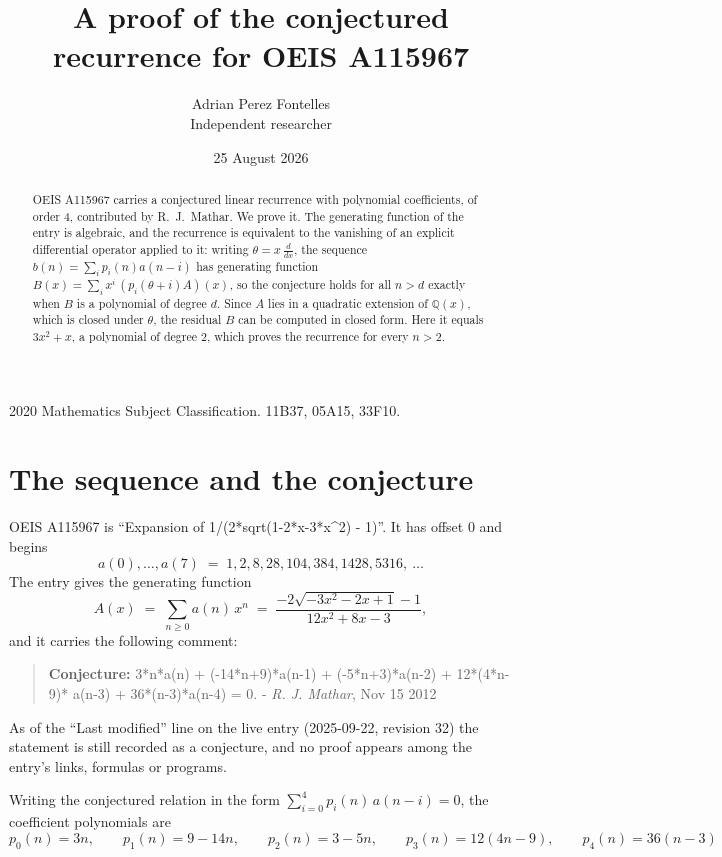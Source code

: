 \documentclass[11pt,a4paper]{article}
\title{A proof of the conjectured recurrence for OEIS A115967}
\author{Adrian Perez Fontelles\\ \small Independent researcher}
\date{25 August 2026}
\theoremstyle{plain}
\theoremstyle{definition}
\begin{document}
\maketitle

\begin{abstract}
OEIS A115967 carries a conjectured linear recurrence with polynomial coefficients, of
order 4, contributed by R.~J.~Mathar. We prove it. The generating function of the
entry is algebraic, and the recurrence is equivalent to the vanishing of an explicit
differential operator applied to it: writing $\theta=x\,\frac{d}{dx}$, the sequence
$b(n)=\sum_{i}p_{i}(n)a(n-i)$ has generating function
$B(x)=\sum_{i}x^{i}\,(p_{i}(\theta+i)A)(x)$, so the conjecture holds for all $n>d$ exactly
when $B$ is a polynomial of degree $d$. Since $A$ lies in a quadratic extension of
$\mathbb{Q}(x)$, which is closed under $\theta$, the residual $B$ can be computed in
closed form. Here it equals $3 x^{2} + x$, a polynomial of degree $2$, which proves
the recurrence for every $n>2$.
\end{abstract}

\noindent\small 2020 Mathematics Subject Classification. 11B37, 05A15, 33F10.\normalsize

\section{The sequence and the conjecture}

OEIS A115967 is ``Expansion of 1/(2*sqrt(1-2*x-3*x\^{}2) - 1)''. It has offset $0$ and begins
\[
a(0),\dots,a(7)\;=\;1, 2, 8, 28, 104, 384, 1428, 5316,\ \dots
\]
The entry gives the generating function
\begin{equation}\label{eq:gf}
A(x)\;=\;\sum_{n\ge 0} a(n)\,x^{n}\;=\;\frac{- 2 \sqrt{- 3 x^{2} - 2 x + 1} - 1}{12 x^{2} + 8 x - 3} ,
\end{equation}
and it carries the following comment:
\begin{quote}\small
\textbf{Conjecture:} 3*n*a(n) + (-14*n+9)*a(n-1) + (-5*n+3)*a(n-2) + 12*(4*n-9)* a(n-3) + 36*(n-3)*a(n-4) = 0. - \emph{R. J. Mathar}, Nov 15 2012
\end{quote}
As of the ``Last modified'' line on the live entry (2025-09-22, revision 32) the
statement is still recorded as a conjecture, and no proof appears among the entry's links,
formulas or programs.

Writing the conjectured relation in the form $\sum_{i=0}^{4}p_{i}(n)\,a(n-i)=0$,
the coefficient polynomials are
\[
p_{0}(n)=3 n,\qquad p_{1}(n)=9 - 14 n,\qquad p_{2}(n)=3 - 5 n,\qquad p_{3}(n)=12 \left(4 n - 9\right),\qquad p_{4}(n)=36 \left(n - 3\right)
\]
\end{document}
